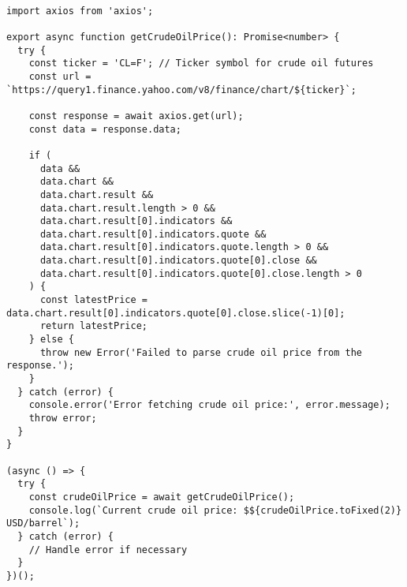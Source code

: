 \begin{lstlisting}[style=htmlcssjs, caption=Fetching the price of crude oil via the Yahoo Finance API]

import axios from 'axios';

export async function getCrudeOilPrice(): Promise<number> {
  try {
    const ticker = 'CL=F'; // Ticker symbol for crude oil futures
    const url = `https://query1.finance.yahoo.com/v8/finance/chart/${ticker}`;

    const response = await axios.get(url);
    const data = response.data;

    if (
      data &&
      data.chart &&
      data.chart.result &&
      data.chart.result.length > 0 &&
      data.chart.result[0].indicators &&
      data.chart.result[0].indicators.quote &&
      data.chart.result[0].indicators.quote.length > 0 &&
      data.chart.result[0].indicators.quote[0].close &&
      data.chart.result[0].indicators.quote[0].close.length > 0
    ) {
      const latestPrice = data.chart.result[0].indicators.quote[0].close.slice(-1)[0];
      return latestPrice;
    } else {
      throw new Error('Failed to parse crude oil price from the response.');
    }
  } catch (error) {
    console.error('Error fetching crude oil price:', error.message);
    throw error;
  }
}

(async () => {
  try {
    const crudeOilPrice = await getCrudeOilPrice();
    console.log(`Current crude oil price: $${crudeOilPrice.toFixed(2)} USD/barrel`);
  } catch (error) {
    // Handle error if necessary
  }
})();



\end{lstlisting}